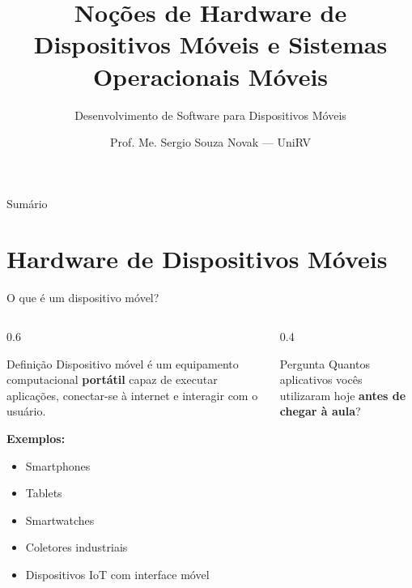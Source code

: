 \documentclass[aspectratio=169]{beamer}
\title[Hardware e SO Móveis]{Noções de Hardware de Dispositivos Móveis e Sistemas Operacionais Móveis}
\subtitle{Desenvolvimento de Software para Dispositivos Móveis}
\author{Prof. Me. Sergio Souza Novak — UniRV}
\begin{document}
\frame[plain]{\titlepage}

\begin{frame}{Sumário}
    \tableofcontents
\end{frame}

\section{Hardware de Dispositivos Móveis}

\begin{frame}{O que é um dispositivo móvel?}
    \begin{columns}[T]
        \begin{column}{0.6\textwidth}
            \begin{block}{Definição}
                Dispositivo móvel é um equipamento computacional \textbf{portátil} capaz de executar
                aplicações, conectar-se à internet e interagir com o usuário.
            \end{block}
            \vspace{0.4em}
            \textbf{Exemplos:}
            \begin{itemize}
                \item Smartphones
                \item Tablets
                \item Smartwatches
                \item Coletores industriais
                \item Dispositivos IoT com interface móvel
            \end{itemize}
        \end{column}
        \begin{column}{0.4\textwidth}
            \begin{alertblock}{Pergunta}
                Quantos aplicativos vocês utilizaram hoje \textbf{antes de chegar à aula}?
            \end{alertblock}
        \end{column}
    \end{columns}
\end{frame}
\end{document}

